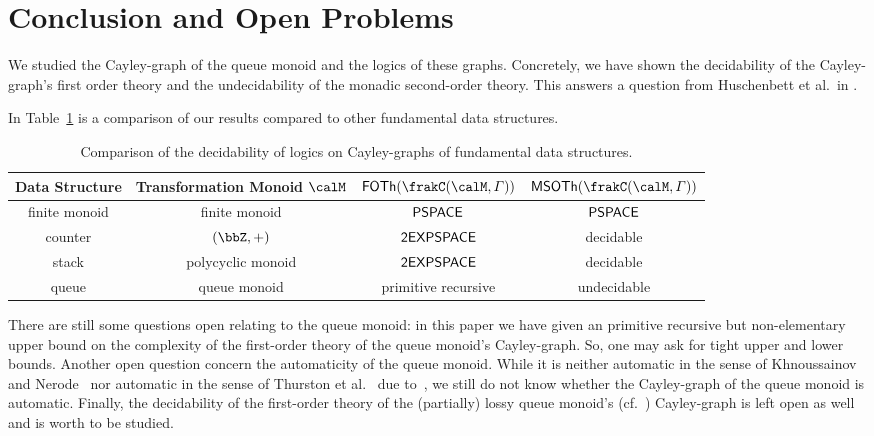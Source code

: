 \section{Conclusion and Open Problems}
We studied the Cayley-graph of the queue monoid and the logics of these graphs. Concretely, we have shown the decidability of the Cayley-graph's first order theory and the undecidability of the monadic second-order theory. This answers a question from Huschenbett et al.\ in \cite{HusKZ17}.

In Table~\ref{tab:conclusion} is a comparison of our results compared to other fundamental data structures.

\begin{table}[h]
	\begin{tabular}{cc|cc}
		Data Structure & Transformation Monoid $\calM$ & $\FOTh{\cayley{\calM}{\varGamma}}$ & $\MSOTh{\cayley{\calM}{\varGamma}}$\\
		\hline
		\hline
		finite monoid & finite monoid & $\mathsf{PSPACE}$ \cite{Graedel03} & $\mathsf{PSPACE}$ \cite{Graedel03}\\
		counter & $(\bbZ,+)$ & $\mathsf{2EXPSPACE}$ \cite{KusL11} & decidable \cite{KusL06}\\
		stack & polycyclic monoid & $\mathsf{2EXPSPACE}$ \cite{KusL11} & decidable \cite{DelKT03,KusL06}\\
		queue & queue monoid & primitive recursive & undecidable
	\end{tabular}
	\caption{Comparison of the decidability of logics on Cayley-graphs of fundamental data structures.\label{tab:conclusion}}
\end{table}\vspace{-.5cm}
There are still some questions open relating to the queue monoid: in this paper we have given an primitive recursive but non-elementary upper bound on the complexity of the first-order theory of the queue monoid's Cayley-graph. So, one may ask for tight upper and lower bounds.
Another open question concern the automaticity of the queue monoid. While it is neither automatic in the sense of Khnoussainov and Nerode~\cite{KN95} nor automatic in the sense of Thurston et al.~\cite{CEHLPT92} due to~\cite{HusKZ17}, we still do not know whether the Cayley-graph of the queue monoid is automatic.
Finally, the decidability of the first-order theory of the (partially) lossy queue monoid's (cf.~\cite{KKP18,Koe18}) Cayley-graph is left open as well and is worth to be studied.
